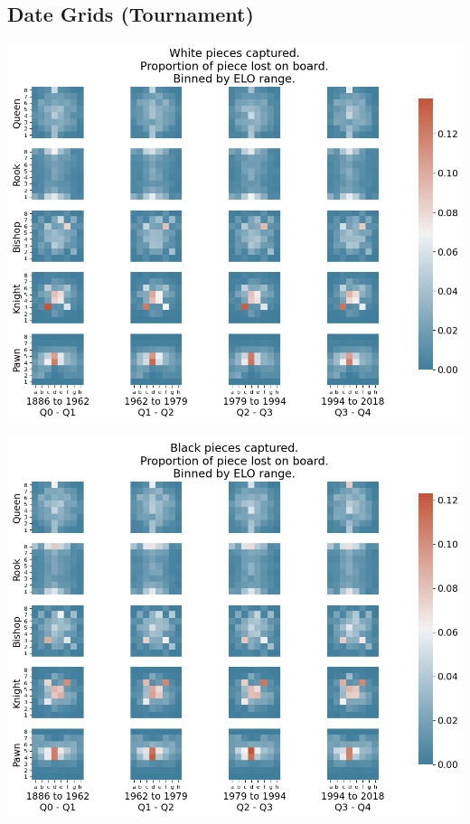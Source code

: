 \documentclass[11pt]{article}
\begin{document}
\subsection{Date Grids (Tournament)}
\label{sec:org7aaa966}
\begin{center}
\includegraphics[width=\textwidth]{Images/_HEATMAP_Queen_Rook_Bishop_Knight_Pawn_WHITE_DATE_TOURNEMENTS.png}
\end{center}

\begin{center}
\includegraphics[width=\textwidth]{Images/_HEATMAP_Queen_Rook_Bishop_Knight_Pawn_BLACK_DATE_TOURNEMENTS.png}
\end{center}
\end{document}
